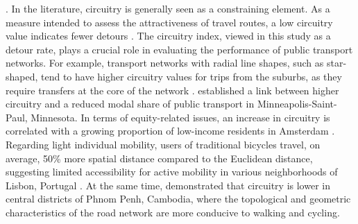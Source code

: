 \begin{refsegment}
{}. In the literature, circuitry is generally seen as a constraining element. As a measure intended to assess the attractiveness of travel routes, a low circuitry value indicates fewer detours \textcolor{blue}{\autocite[2]{costa_circuity_2021}}. The circuitry index, viewed in this study as a detour rate, plays a crucial role in evaluating the performance of public transport networks. For example, transport networks with radial line shapes, such as star-shaped, tend to have higher circuitry values for trips from the suburbs, as they require transfers at the core of the network \textcolor{blue}{\autocite[1]{dixit_examining_2021}}. \textcolor{blue}{\textcite[150]{huang_circuity_2015}} established a link between higher circuitry and a reduced modal share of public transport in Minneapolis-Saint-Paul, Minnesota. In terms of equity-related issues, an increase in circuitry is correlated with a growing proportion of low-income residents in Amsterdam \textcolor{blue}{\autocite[7]{dixit_examining_2021}}. Regarding light individual mobility, users of traditional bicycles travel, on average, 50\% more spatial distance compared to the Euclidean distance, suggesting limited accessibility for active mobility in various neighborhoods of Lisbon, Portugal \textcolor{blue}{\autocite[13]{costa_circuity_2021}}. At the same time, \textcolor{blue}{\textcite[179]{yen_how_2023}} demonstrated that circuitry is lower in central districts of Phnom Penh, Cambodia, where the topological and geometric characteristics of the road network are more conducive to walking and cycling.%


\end{refsegment}
